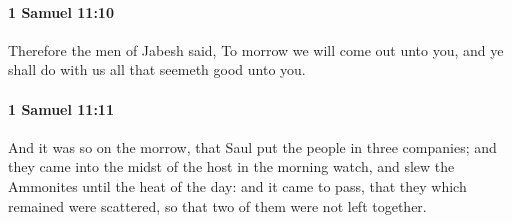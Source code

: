 		\paragraph{1 Samuel 11:10} %
			\label{1SAMUEL-11-10}

			Therefore the men of Jabesh said, To morrow we will come out unto you, and ye shall do with us all that seemeth good unto you.


		\paragraph{1 Samuel 11:11} %
			\label{1SAMUEL-11-11}

			And it was so on the morrow, that Saul put the people in three companies; and they came into the midst of the host in the morning watch, and slew the Ammonites until the heat of the day: and it came to pass, that they which remained were scattered, so that two of them were not left together.


